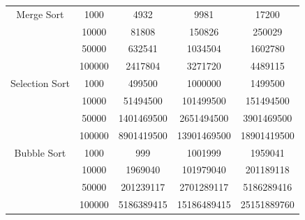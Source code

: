 \documentclass[12pt,a4paper]{article}
\begin{document}
\begin{table}[H]
\begin{tabular}{@{}ccccc@{}}
        Merge Sort           & 1000    & 4932      & 9981        & 17200       \\
                            & 10000   & 81808     & 150826      & 250029      \\
                            & 50000   & 632541    & 1034504     & 1602780     \\
                            & 100000  & 2417804   & 3271720     & 4489115     \\ \midrule
        Selection Sort       & 1000    & 499500    & 1000000     & 1499500     \\
                            & 10000   & 51494500  & 101499500   & 151494500   \\
                            & 50000   & 1401469500 & 2651494500  & 3901469500  \\
                            & 100000  & 8901419500 & 13901469500 & 18901419500 \\ \midrule
        Bubble Sort          & 1000    & 999       & 1001999     & 1959041     \\
                            & 10000   & 1969040   & 101979040   & 201189118   \\
                            & 50000   & 201239117 & 2701289117  & 5186289416  \\
                            & 100000  & 5186389415 & 15186489415 & 25151889760 \\ \bottomrule
    \end{tabular}
\end{table}
\end{document}
